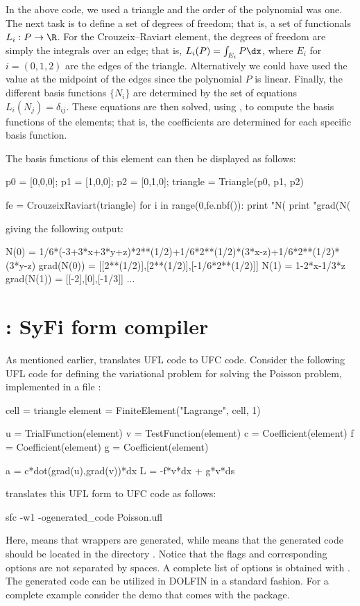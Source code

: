 In the above code, we used a triangle and the order of the polynomial
was one. The next task is to define a set of degrees of freedom; that is,
a set of functionals $L_i : P \rightarrow \R$.  For the Crouzeix--Raviart
element, the degrees of freedom are simply the integrals over an edge;
that is, $L_i(P) = \int_{E_i} P \dx$, where $E_i$ for $i=(0,1,2)$ are the
edges of the triangle. Alternatively we could have used the value at
the midpoint of the edges since the polynomial $P$ is linear.  Finally,
the different basis functions $\{N_i\}$ are determined by the set of
equations $L_i(N_j) = \delta_{ij}$.  These equations are then solved,
using , to compute the basis functions of the elements;
that is, the coefficients \emp{[a0\_0, a0\_1, a0\_2]} are determined for
each specific basis function.

The basis functions of this element can then be displayed as follows:
\begin{python}
p0 = [0,0,0]; p1 = [1,0,0]; p2 = [0,1,0];
triangle = Triangle(p0, p1, p2)

fe = CrouzeixRaviart(triangle)
for i in range(0,fe.nbf()):
  print "N(%
  print "grad(N(%
\end{python}
giving the following output:
\vspace*{9pt}\begin{c++}
N(0)       =  1/6*(-3+3*x+3*y+z)*2**(1/2)+1/6*2**(1/2)*(3*x-z)+1/6*2**(1/2)*(3*y-z)
grad(N(0)) =  [[2**(1/2)],[2**(1/2)],[-1/6*2**(1/2)]]
N(1)       =  1-2*x-1/3*z
grad(N(1)) =  [[-2],[0],[-1/3]]
...
\end{c++}

\section{\sfc{}: SyFi form compiler}

As mentioned earlier, \sfc{} translates UFL code to UFC code. Consider the
following UFL code for defining the variational problem for solving the
Poisson problem, implemented in a file :
\begin{python}
cell = triangle
element = FiniteElement("Lagrange", cell, 1)

u = TrialFunction(element)
v = TestFunction(element)
c = Coefficient(element)
f = Coefficient(element)
g = Coefficient(element)

a = c*dot(grad(u),grad(v))*dx
L = -f*v*dx + g*v*ds
\end{python}
\sfc{} translates this UFL form to UFC code as follows:
\begin{bash}
sfc -w1  -ogenerated_code Poisson.ufl
\end{bash}
Here,  means that \dolfin{} wrappers are generated, while
 means that the generated code should be
located in the directory . Notice that the flags
and corresponding options are not separated by spaces. A complete
list of options is obtained with .  The generated code can be
utilized in DOLFIN in a standard fashion.  For a complete example consider
the demo  that comes with the \syfi{} package.


